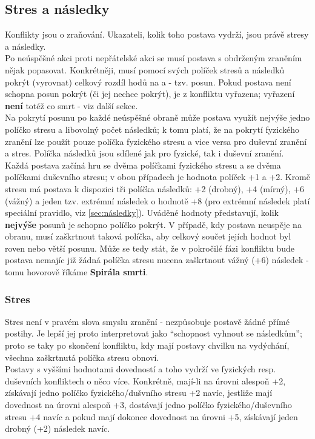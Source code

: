 \subsection{Stres a následky}
\label{sec:stres-nasledky}

Konflikty jsou o zraňování. Ukazateli, kolik toho postava vydrží, jsou právě stresy a následky.\\
Po neúspěšné akci  proti nepřátelské akci  se musí postava s obdrženým zraněním nějak popasovat. Konkrétněji, musí pomocí svých políček stresů a následků pokrýt (vyrovnat) celkový rozdíl hodů na  a  - tzv. posun. Pokud postava není schopna posun pokrýt (či jej nechce pokrýt), je z konfliktu vyřazena; vyřazení \textbf{není} totéž co smrt - viz další sekce.\\
Na pokrytí posunu po každé neúspěšné obraně může postava využít nejvýše jedno políčko stresu a libovolný počet následků; k tomu platí, že na pokrytí fyzického zranění lze použít pouze políčka fyzického stresu a vice versa pro duševní zranění a stres. Políčka následků jsou sdílené jak pro fyzické, tak i duševní zranění.\\
Každá postava začíná hru se dvěma políčkami fyzického stresu a se dvěma políčkami duševního stresu; v obou případech je hodnota políček +1 a +2. Kromě stresu má postava k dispozici tři políčka následků: +2 (drobný), +4 (mírný), +6 (vážný) a jeden tzv. extrémní následek o hodnotě +8 (pro extrémní následek platí speciální pravidlo, viz \ref{sec:následky}). Uváděné hodnoty představují, kolik \textbf{nejvýše} posunů je schopno políčko pokrýt. V případě, kdy postava neuspěje na obranu, musí zaškrtnout taková políčka, aby celkový součet jejích hodnot byl roven nebo větší posunu. Může se tedy stát, že v pokročilé fázi konfliktu bude postava nemajíc již žádná políčka stresu nucena zaškrtnout vážný (+6) následek - tomu hovorově říkáme \textbf{Spirála smrti}.\\

\subsubsection{Stres}
\label{sec:stres}

Stres není v pravém slova smyslu zranění - nezpůsobuje postavě žádné přímé postihy. Je lepší jej proto interpretovat jako ``schopnost vyhnout se následkům''; proto se taky po skončení konfliktu, kdy mají postavy chvilku na vydýchání, všechna zaškrtnutá políčka stresu obnoví.\\
Postavy s vyššími hodnotami dovedností  a  toho vydrží ve fyzických resp. duševních konfliktech o něco více. Konkrétně, mají-li  na úrovni alespoň +2, získávají jedno políčko fyzického/dušvního stresu +2 navíc, jestliže mají dovednost na úrovni alespoň +3, dostávají jedno políčko fyzického/duševního stresu +4 navíc a pokud mají dokonce dovednost na úrovni +5, získávají jeden drobný (+2) následek navíc.

